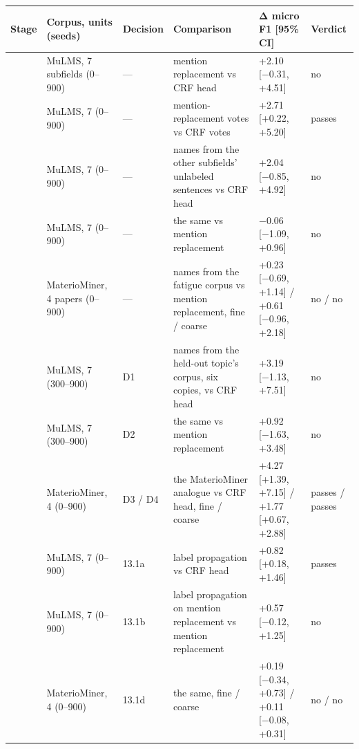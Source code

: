 \documentclass[11pt,a4paper]{article}
\begin{document}
\begin{table}[tp]
\centering\footnotesize\renewcommand{\arraystretch}{0.85}\setlength{\tabcolsep}{3.5pt}
\begin{tabular}{>{\raggedright\arraybackslash}p{}>{\raggedright\arraybackslash}p{}>{\raggedright\arraybackslash}p{}>{\raggedright\arraybackslash}p{}>{\raggedright\arraybackslash}p{}>{\raggedright\arraybackslash}p{}}
\toprule
\textbf{Stage} & \textbf{Corpus, units (seeds)} & \textbf{Decision} & \textbf{Comparison} & \textbf{Δ micro F1 {[}95\% CI{]}} & \textbf{Verdict} \\
\midrule
10 & MuLMS, 7 subfields (0--900) & --- & mention replacement vs CRF head & +2.10 {[}−0.31, +4.51{]} & no \\
10 & MuLMS, 7 (0--900) & --- & mention-replacement votes vs CRF votes & +2.71 {[}+0.22, +5.20{]} & passes \\
11 & MuLMS, 7 (0--900) & --- & names from the other subfields' unlabeled sentences vs CRF head & +2.04 {[}−0.85, +4.92{]} & no \\
11 & MuLMS, 7 (0--900) & --- & the same vs mention replacement & −0.06 {[}−1.09, +0.96{]} & no \\
11 & MaterioMiner, 4 papers (0--900) & --- & names from the fatigue corpus vs mention replacement, fine / coarse & +0.23 {[}−0.69, +1.14{]} / +0.61 {[}−0.96, +2.18{]} & no / no \\
12 & MuLMS, 7 (300--900) & D1 & names from the held-out topic's corpus, six copies, vs CRF head & +3.19 {[}−1.13, +7.51{]} & no \\
12 & MuLMS, 7 (300--900) & D2 & the same vs mention replacement & +0.92 {[}−1.63, +3.48{]} & no \\
12 & MaterioMiner, 4 (0--900) & D3 / D4 & the MaterioMiner analogue vs CRF head, fine / coarse & +4.27 {[}+1.39, +7.15{]} / +1.77 {[}+0.67, +2.88{]} & passes / passes \\
13 & MuLMS, 7 (0--900) & 13.1a & label propagation vs CRF head & +0.82 {[}+0.18, +1.46{]} & passes \\
13 & MuLMS, 7 (0--900) & 13.1b & label propagation on mention replacement vs mention replacement & +0.57 {[}−0.12, +1.25{]} & no \\
13 & MaterioMiner, 4 (0--900) & 13.1d & the same, fine / coarse & +0.19 {[}−0.34, +0.73{]} / +0.11 {[}−0.08, +0.31{]} & no / no \\

\end{tabular}
\end{table}
\end{document}
